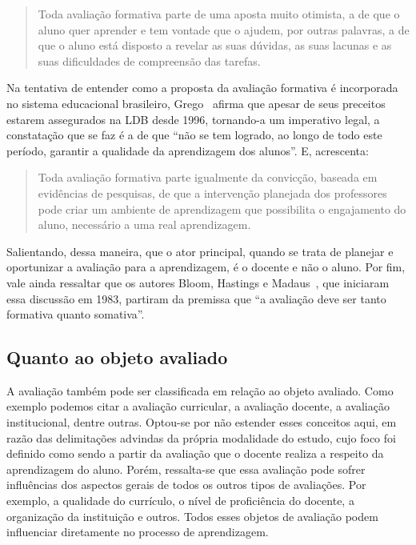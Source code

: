 \begin{quote}
Toda avaliação formativa parte de uma aposta muito otimista, a de que o aluno quer aprender e tem vontade que o ajudem, por outras palavras, a de que o aluno está disposto a revelar as suas dúvidas, as suas lacunas e as suas dificuldades de compreensão das tarefas.~\cite{perrenoud@93}
\end{quote}

Na tentativa de entender como a proposta da avaliação formativa é incorporada no sistema educacional brasileiro, Grego~\cite{grego@2013} afirma que apesar de seus preceitos estarem assegurados na LDB desde 1996, tornando-a um imperativo legal, a constatação que se faz é a de que ``não se tem logrado, ao longo de todo este período, garantir a qualidade da aprendizagem dos alunos''. E, acrescenta:

\begin{quote}
Toda avaliação formativa parte igualmente da convicção, baseada em evidências de pesquisas, de que a intervenção planejada dos professores pode criar um ambiente de aprendizagem que possibilita o engajamento do aluno, necessário a uma real aprendizagem.~\cite{grego@2013}
\end{quote}

Salientando, dessa maneira, que o ator principal, quando se trata de planejar e oportunizar a avaliação para a aprendizagem, é o docente e não o aluno. Por fim, vale ainda ressaltar que os autores Bloom, Hastings e Madaus~\cite{bloom1983manual}, que iniciaram essa discussão em 1983, partiram da premissa que ``a avaliação deve ser tanto formativa quanto somativa''.

\subsection{Quanto ao objeto avaliado}%

A avaliação também pode ser classificada em relação ao objeto avaliado. Como exemplo podemos citar a avaliação curricular, a avaliação docente, a avaliação institucional, dentre outras. Optou-se por não estender esses conceitos aqui, em razão das delimitações advindas da própria modalidade do estudo, cujo foco foi definido como sendo a partir da avaliação que o docente realiza a respeito da aprendizagem do aluno. Porém, ressalta-se que essa avaliação pode sofrer influências dos aspectos gerais de todos os outros tipos de avaliações. Por exemplo, a qualidade do currículo, o nível de proficiência do docente, a organização da instituição e outros. Todos esses objetos de avaliação podem influenciar diretamente no processo de aprendizagem.

